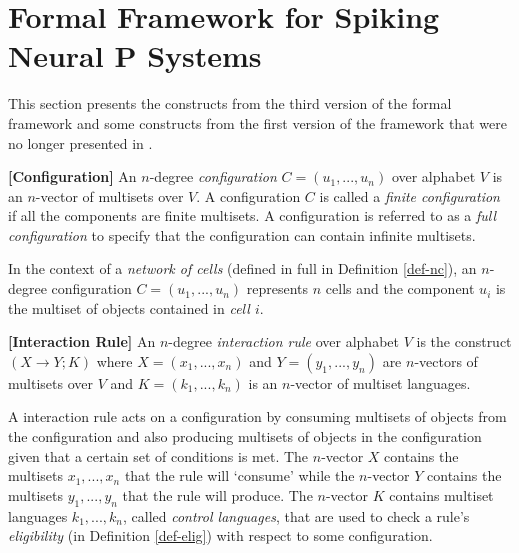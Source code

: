 \documentclass[a4paper]{article}
\theoremstyle{definition}
\newcommand{\ra}{\rightarrow}
\begin{document}

\section{Formal Framework for Spiking Neural P Systems}\label{sec-ff}

This section presents the constructs from the third version of the formal framework 
\cite{verlan-2020-ff-3} and some constructs from the first version of the framework 
\cite{freund-2007-ff-1} that were no longer presented in \cite{verlan-2020-ff-3}.


\label{def-conf} \textbf{[Configuration]} An $n$-degree \emph{configuration} 
$C = (u_1,...,u_n)$ over alphabet $V$ is an $n$-vector of multisets over $V$. A configuration $C$ is 
called a \emph{finite configuration} if all the components are finite multisets. A configuration is 
referred to as a \emph{full configuration} to specify that the configuration can contain infinite 
multisets.

In the context of a \emph{network of cells} (defined in full in Definition \ref{def-nc}), an
$n$-degree configuration $C = (u_1,...,u_n)$ represents $n$ cells and the component $u_i$ is the
multiset of objects contained in \emph{cell $i$}.


\label{def-rule} \textbf{[Interaction Rule]} An $n$-degree \emph{interaction rule} over
alphabet $V$ is the construct $(X \ra Y; K)$ where $X=(x_1,...,x_n)$ and $Y=(y_1,...,y_n)$ 
are $n$-vectors of multisets over $V$ and $K = (k_1,...,k_n)$ is an $n$-vector of multiset
languages.

A interaction rule acts on a configuration by consuming multisets of objects from the configuration
and also producing multisets of objects in the configuration given that a certain set of conditions
is met. The $n$-vector $X$ contains the multisets $x_1,...,x_n$ that the rule will `consume' while
the $n$-vector $Y$ contains the multisets $y_1,...,y_n$ that the rule will produce. The $n$-vector 
$K$ contains multiset languages $k_1,...,k_n$, called \emph{control languages}, that are used to 
check a rule's \emph{eligibility} (in Definition \ref{def-elig}) with respect to some configuration.
\end{document}
